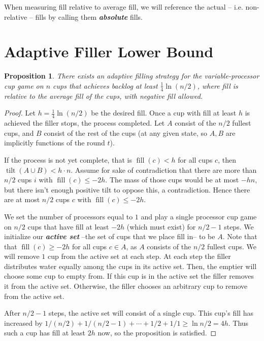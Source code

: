 \documentclass[twocolumn]{article}[10pt]
\newcommand{\defn}[1]{{\textit{\textbf{\boldmath #1}}}\xspace}
\DeclareMathOperator{\tilt}{\text{tilt}}
\DeclareMathOperator{\fil}{\text{fill}}
\newtheorem{proposition}{Proposition}
\begin{document}
When measuring fill relative to average fill, we will reference the actual --
i.e. non-relative -- fills by calling them \defn{absolute} fills.

\section{Adaptive Filler Lower Bound}\label{sec:adaptive}
\begin{proposition}
\label{prop:adaptiveBase}
  There exists an adaptive filling strategy for the variable-processor cup game
  on $n$ cups that achieves backlog at least $\frac{1}{4}\ln (n/2)$, where fill
  is relative to the average fill of the cups, with negative fill allowed.
\end{proposition}
\begin{proof}
  Let $h = \frac{1}{4}\ln (n/2)$ be the desired fill. Once a cup with fill at
  least $h$ is achieved the filler stops, the process completed.  
  Let $A$ consist of the $n/2$ fullest cups, and $B$ consist of the rest of the
  cups (at any given state, so $A, B$ are implicitly functions of the round
  $t$).

  If the process is not yet complete, that is $\fil(c) < h$ for all cups $c$,
  then $\tilt(A\cup B) < h\cdot n$. Assume for
  sake of contradiction that there are more than $n/2$ cups $i$ with $\fil(c)
  \le -2h$. The mass of those cups would be at most $-hn$, but there isn't
  enough positive tilt to oppose this, a contradiction. Hence there are at most
  $n/2$ cups $c$ with $\fil(c) \le -2h$. 

  We set the number of processors equal to $1$ and play a single processor cup
  game on $n/2$ cups that have fill at least $-2h$ (which must exist) for $n/2
  -1$ steps. We initialize our \defn{active set} --the set of cups that we
  place fill in-- to be $A$. Note that that $\fil(c) \ge -2h$ for all cups $c\in
  A$, as $A$ consists of the $n/2$ fullest cups. We will remove $1$ cup from
  the active set at each step.
  At each step the filler distributes water equally among the cups in its
  active set. Then, the emptier will choose some cup to empty from. If this cup
  is in the active set the filler removes it from the active set. Otherwise, the
  filler chooses an arbitrary cup to remove from the active set.

  After $n/2-1$ steps, the active set will consist of a single cup. This cup's
  fill has increased by $1/(n/2) + 1/(n/2 - 1) + \cdots + 1/2 + 1/1
  \ge \ln n/2 = 4h$. Thus such a cup has fill at least $2h$ now, so the
  proposition is satisfied.
\end{proof}
\end{document}
